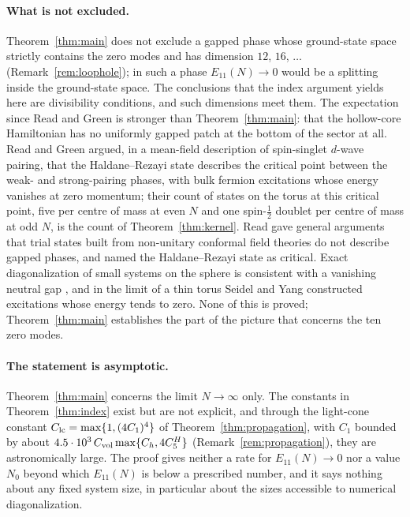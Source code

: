 \paragraph{What is not excluded.}
Theorem~\ref{thm:main} does not exclude a gapped phase whose ground-state space strictly contains the zero modes and has
dimension $12$, $16$, $\dots$ (Remark~\ref{rem:loophole}); in such a phase $E_{11}(N)\to0$ would be a splitting inside the
ground-state space. The conclusions that the index argument yields here are divisibility conditions, and such
dimensions meet them. The
expectation since Read and Green \cite{RG00} is stronger than Theorem~\ref{thm:main}: that the hollow-core Hamiltonian has
no uniformly gapped patch at the bottom of the sector at all. Read and Green argued, in a mean-field description of
spin-singlet $d$-wave pairing, that the Haldane--Rezayi state describes the critical point between the weak- and
strong-pairing phases, with bulk fermion excitations whose energy vanishes at zero momentum; their count of states on
the torus at this critical point, five per centre of mass at even $N$ and one spin-$\frac12$ doublet per centre of mass at
odd $N$, is the count of Theorem~\ref{thm:kernel}. Read \cite{Rea09a,Rea09b} gave general arguments that trial states
built from non-unitary conformal field theories do not describe gapped phases, and named the Haldane--Rezayi state as
critical. Exact diagonalization of small systems on the sphere is consistent with a vanishing neutral gap
\cite{CRE19,NPBG23}, and in the limit of a thin torus Seidel and Yang \cite{SY11} constructed excitations whose energy
tends to zero. None of this is proved; Theorem~\ref{thm:main} establishes the part of the picture that concerns the ten
zero modes.

\paragraph{The statement is asymptotic.}
Theorem~\ref{thm:main} concerns the limit $N\to\infty$ only. The constants in Theorem~\ref{thm:index} exist but are not
explicit, and through the light-cone constant $C_{\rm lc}=\max\{1,(4C_1)^4\}$ of Theorem~\ref{thm:propagation}, with $C_1$ bounded by
about $4.5\cdot10^3\,C_{\mathrm{vol}}\max\{C_h,4C^H_5\}$ (Remark~\ref{rem:propagation}), they are astronomically large. The proof gives neither a
rate for $E_{11}(N)\to0$ nor a value $N_0$ beyond which $E_{11}(N)$ is below a prescribed number, and it says nothing
about any fixed system size, in particular about the sizes accessible to numerical diagonalization.


